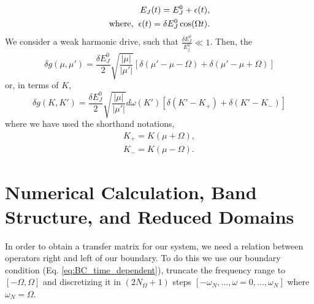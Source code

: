 %
\begin{equation}\label{eq:time_dependent_energy}
\begin{split}
    E_J(t) = E^0_J + \epsilon(t),
    \\
    \text{where,} \hspace{2mm}
    \epsilon(t) = \delta E^0_J \cos(\Omega t). 
\end{split}
\end{equation}
%
We consider a weak harmonic drive, such that $\frac{\delta E^0_J}{E^0_j} \ll 1$. Then, the
%
\begin{equation}
    \delta g(\mu, \mu') =
    \frac{\delta E_J^0}{2}
    \sqrt{\frac{|\mu|}{|\mu'|}}
    \left[
    \delta (\mu' - \mu - \Omega) +
    \delta(\mu' - \mu + \Omega)
    \right]
\end{equation}
%
or, in terms of $K$,
\begin{equation} \label{eq:dw_K_continuous}
    \delta g(K,K')= 
    \frac{\delta E_J^0}{2}
    \sqrt{\frac{|\mu|}{|\mu'|}}
    d\omega (K')
    \left[
    \delta (K' - K_+) + \delta(K' - K_-)
    \right]
\end{equation}
% 
where we have used the shorthand notations,
%
\begin{gather}
    K_+ = K(\mu + \Omega),\\
    K_- = K(\mu - \Omega).
\end{gather}
%

\section{Numerical Calculation, Band Structure, and Reduced Domains}

In order to obtain a transfer matrix for our system, we need a relation between operators right and left of our boundary. To do this we use our boundary condition (Eq. \ref{eq:BC_time_dependent}), truncate the frequency range to $[-\Omega, \Omega]$ and discretizing it in $(2 N_{\Omega} + 1)$ steps $[-\omega_N, ..., \omega = 0, ..., \omega_N]$ where $\omega_N = \Omega$. 

